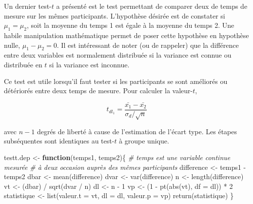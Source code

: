 \documentclass[
]{book}
\newenvironment{Shaded}{}{}
\newcommand{\AttributeTok}[1]{#1}
\newcommand{\CommentTok}[1]{\textit{#1}}
\newcommand{\ControlFlowTok}[1]{\textbf{#1}}
\newcommand{\DecValTok}[1]{#1}
\newcommand{\FunctionTok}[1]{#1}
\newcommand{\NormalTok}[1]{#1}
\newcommand{\OtherTok}[1]{#1}
\newcommand{\SpecialCharTok}[1]{#1}
\begin{document}
Un dernier test-\(t\) a présenté est le test permettant de comparer deux de temps de mesure sur les mêmes participants. L'hypothèse désirée est de constater si \(\mu_1 = \mu_2\), soit la moyenne du temps 1 est égale à la moyenne du temps 2. Une habile manipulation mathématique permet de poser cette hypothèse en hypothèse nulle, \(\mu_1-\mu_2=0\). Il est intéressant de noter (ou de rappeler) que la différence entre deux variables est normalement distribuée si la variance est connue ou distribuée en \(t\) si la variance est inconnue.

Ce test est utile lorsqu'il faut tester si les participants se sont améliorés ou détériorés entre deux temps de mesure. Pour calculer la valeur-\(t\),

\[ t_{dl_1} = \frac{\bar{x_1}-\bar{x_2}}{\sigma_d/\sqrt{n}} \]

avec \(n-1\) degrés de liberté à cause de l'estimation de l'écart type. Les étapes subséquentes sont identiques au test-\(t\) à groupe unique.

\begin{Shaded}
\begin{Highlighting}[]
\NormalTok{testt.dep }\OtherTok{\textless{}{-}} \ControlFlowTok{function}\NormalTok{(temps1, temps2)\{}
  \CommentTok{\# temps est une variable continue mesurée }
  \CommentTok{\# à deux occasion auprès des mêmes participants}
\NormalTok{  difference }\OtherTok{\textless{}{-}}\NormalTok{ temps1 }\SpecialCharTok{{-}}\NormalTok{ temps2}
\NormalTok{  dbar }\OtherTok{\textless{}{-}} \FunctionTok{mean}\NormalTok{(difference)}
\NormalTok{  dvar }\OtherTok{\textless{}{-}} \FunctionTok{var}\NormalTok{(difference)}
\NormalTok{  n }\OtherTok{\textless{}{-}} \FunctionTok{length}\NormalTok{(difference)}
\NormalTok{  vt }\OtherTok{\textless{}{-}}\NormalTok{ (dbar) }\SpecialCharTok{/} \FunctionTok{sqrt}\NormalTok{(dvar }\SpecialCharTok{/}\NormalTok{ n)}
\NormalTok{  dl }\OtherTok{\textless{}{-}}\NormalTok{ n }\SpecialCharTok{{-}} \DecValTok{1}
\NormalTok{  vp }\OtherTok{\textless{}{-}}\NormalTok{ (}\DecValTok{1} \SpecialCharTok{{-}} \FunctionTok{pt}\NormalTok{(}\FunctionTok{abs}\NormalTok{(vt), }\AttributeTok{df =}\NormalTok{ dl)) }\SpecialCharTok{*} \DecValTok{2}
\NormalTok{  statistique }\OtherTok{\textless{}{-}} \FunctionTok{list}\NormalTok{(}\AttributeTok{valeur.t =}\NormalTok{ vt, }\AttributeTok{dl =}\NormalTok{ dl, }\AttributeTok{valeur.p =}\NormalTok{ vp)}
  \FunctionTok{return}\NormalTok{(statistique)}
\NormalTok{\}}
\end{Highlighting}
\end{Shaded}
\end{document}

